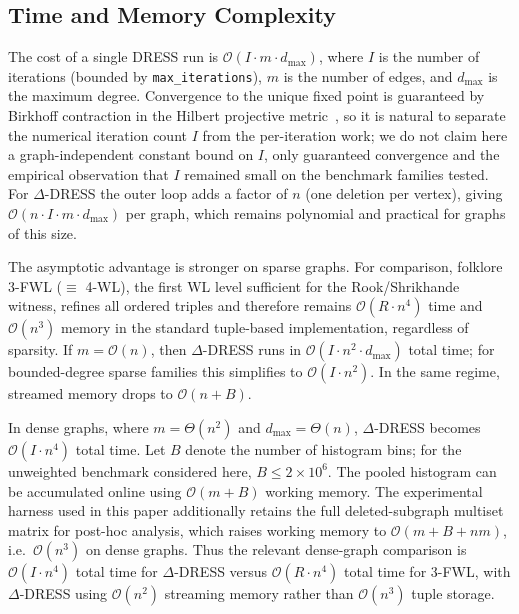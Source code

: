 \documentclass[11pt,a4paper]{article}
\begin{document}
\subsection{Time and Memory Complexity}

The cost of a single DRESS run is $\mathcal{O}(I \cdot m \cdot d_{\max})$, where $I$ is the number of iterations (bounded by \texttt{max\_iterations}), $m$ is the number of edges, and $d_{\max}$ is the maximum degree.  Convergence to the unique fixed point is guaranteed by Birkhoff contraction in the Hilbert projective metric~\cite{castrillo2026dress}, so it is natural to separate the numerical iteration count $I$ from the per-iteration work; we do not claim here a graph-independent constant bound on $I$, only guaranteed convergence and the empirical observation that $I$ remained small on the benchmark families tested.
For $\Delta$-DRESS the outer loop adds a factor of $n$ (one deletion per vertex), giving $\mathcal{O}(n \cdot I \cdot m \cdot d_{\max})$ per graph, which remains polynomial and practical for graphs of this size.

The asymptotic advantage is stronger on sparse graphs.  For comparison, folklore 3-FWL ($\equiv$ 4-WL), the first WL level sufficient for the Rook/Shrikhande witness, refines all ordered triples and therefore remains $\mathcal{O}(R \cdot n^4)$ time and $\mathcal{O}(n^3)$ memory in the standard tuple-based implementation, regardless of sparsity.  If $m = \mathcal{O}(n)$, then $\Delta$-DRESS runs in $\mathcal{O}(I \cdot n^2 \cdot d_{\max})$ total time; for bounded-degree sparse families this simplifies to $\mathcal{O}(I \cdot n^2)$.  In the same regime, streamed memory drops to $\mathcal{O}(n + B)$.

In dense graphs, where $m = \Theta(n^2)$ and $d_{\max} = \Theta(n)$, $\Delta$-DRESS becomes $\mathcal{O}(I \cdot n^4)$ total time.  Let $B$ denote the number of histogram bins; for the unweighted benchmark considered here, $B \le 2 \times 10^6$.  The pooled histogram can be accumulated online using $\mathcal{O}(m + B)$ working memory.  The experimental harness used in this paper additionally retains the full deleted-subgraph multiset matrix for post-hoc analysis, which raises working memory to $\mathcal{O}(m + B + n m)$, i.e.\ $\mathcal{O}(n^3)$ on dense graphs.  Thus the relevant dense-graph comparison is $\mathcal{O}(I \cdot n^4)$ total time for $\Delta$-DRESS versus $\mathcal{O}(R \cdot n^4)$ total time for 3-FWL, with $\Delta$-DRESS using $\mathcal{O}(n^2)$ streaming memory rather than $\mathcal{O}(n^3)$ tuple storage.
\end{document}
